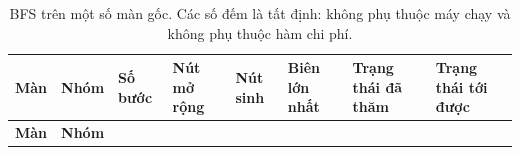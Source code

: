 \begin{longtable}[]{@{}
  >{\raggedright\arraybackslash}p{}
  >{\raggedright\arraybackslash}p{}
  >{\raggedright\arraybackslash}p{}
  >{\raggedright\arraybackslash}p{}
  >{\raggedright\arraybackslash}p{}
  >{\raggedright\arraybackslash}p{}
  >{\raggedright\arraybackslash}p{}
  >{\raggedright\arraybackslash}p{}@{}}
\caption{ BFS trên một số màn gốc. Các số đếm là tất định: không phụ thuộc máy chạy và không phụ thuộc hàm chi phí.}\tabularnewline
\toprule\noalign{}
\rowcolor{tablehead}\begin{minipage}[b]{\linewidth}\raggedright
\textbf{Màn}
\end{minipage} & \begin{minipage}[b]{\linewidth}\raggedright
\textbf{Nhóm}
\end{minipage} & \begin{minipage}[b]{\linewidth}\raggedright
\textbf{Số bước}
\end{minipage} & \begin{minipage}[b]{\linewidth}\raggedright
\textbf{Nút mở rộng}
\end{minipage} & \begin{minipage}[b]{\linewidth}\raggedright
\textbf{Nút sinh}
\end{minipage} & \begin{minipage}[b]{\linewidth}\raggedright
\textbf{Biên lớn nhất}
\end{minipage} & \begin{minipage}[b]{\linewidth}\raggedright
\textbf{Trạng thái đã thăm}
\end{minipage} & \begin{minipage}[b]{\linewidth}\raggedright
\textbf{Trạng thái tới được}
\end{minipage} \\
\midrule\noalign{}
\endfirsthead
\toprule\noalign{}
\rowcolor{tablehead}\begin{minipage}[b]{\linewidth}\raggedright
\textbf{Màn}
\end{minipage} & \begin{minipage}[b]{\linewidth}\raggedright
\textbf{Nhóm}
\end{minipage} & \begin{minipage}[b]{\linewidth}\raggedright

\end{minipage}
\end{longtable}
